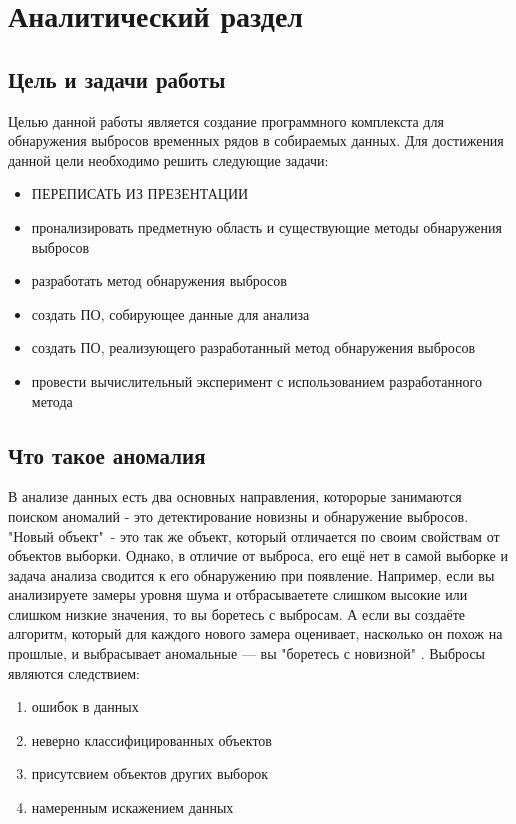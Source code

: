 \chapter{Аналитический раздел}
\label{cha:analysis}
\section{Цель и задачи работы}
Целью данной работы является создание программного комплекста для обнаружения выбросов временных рядов в собираемых данных.
Для достижения данной цели необходимо решить следующие задачи:
\begin{itemize}
	\item ПЕРЕПИСАТЬ ИЗ ПРЕЗЕНТАЦИИ
	\item пронализировать предметную область и существующие методы обнаружения выбросов
	\item разработать метод обнаружения выбросов
	\item создать ПО, собирующее данные для анализа
	\item создать ПО, реализующего  разработанный метод обнаружения выбросов
	\item провести вычислительный эксперимент с использованием разработанного метода
	
\end{itemize}
\section{Что такое аномалия}
В анализе данных есть два основных направления, которорые занимаются поиском аномалий - это детектирование новизны и обнаружение выбросов. "Новый объект"\ - это так же объект, который отличается по своим свойствам от объектов  выборки. Однако, в отличие от выброса,  его ещё нет в самой выборке и задача анализа сводится к его обнаружению при появление. Например, если вы анализируете замеры уровня шума и отбрасываетете слишком высокие или слишком низкие значения, то вы боретесь с выбросам. А если вы создаёте алгоритм, который для каждого нового замера оценивает, насколько он похож на прошлые, и выбрасывает аномальные — вы "боретесь с новизной"
\cite{Book01}.
Выбросы являются следствием:
\begin{enumerate}
	\item ошибок в данных
	\item неверно классифицированных объектов
	\item присутсвием объектов других выборок
	\item намеренным искажением данных
\end{enumerate}


